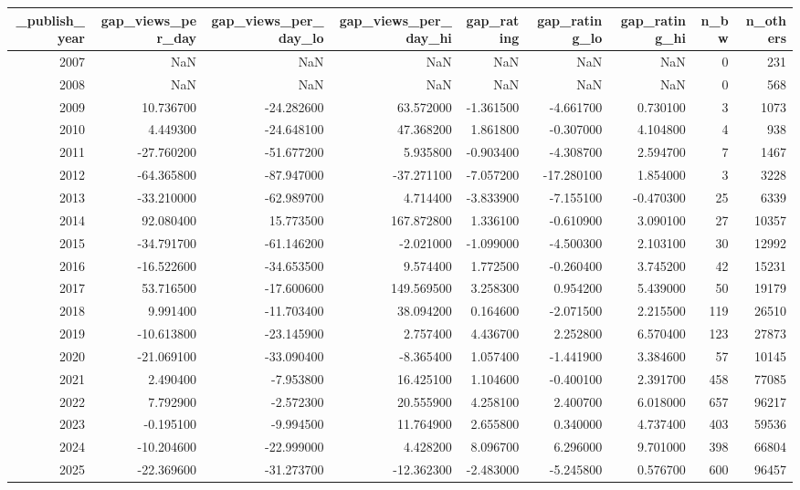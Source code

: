 \begin{tabular}{rrrrrrrrr}
\toprule
_publish_year & gap_views_per_day & gap_views_per_day_lo & gap_views_per_day_hi & gap_rating & gap_rating_lo & gap_rating_hi & n_bw & n_others \\
\midrule
2007 & NaN & NaN & NaN & NaN & NaN & NaN & 0 & 231 \\
2008 & NaN & NaN & NaN & NaN & NaN & NaN & 0 & 568 \\
2009 & 10.736700 & -24.282600 & 63.572000 & -1.361500 & -4.661700 & 0.730100 & 3 & 1073 \\
2010 & 4.449300 & -24.648100 & 47.368200 & 1.861800 & -0.307000 & 4.104800 & 4 & 938 \\
2011 & -27.760200 & -51.677200 & 5.935800 & -0.903400 & -4.308700 & 2.594700 & 7 & 1467 \\
2012 & -64.365800 & -87.947000 & -37.271100 & -7.057200 & -17.280100 & 1.854000 & 3 & 3228 \\
2013 & -33.210000 & -62.989700 & 4.714400 & -3.833900 & -7.155100 & -0.470300 & 25 & 6339 \\
2014 & 92.080400 & 15.773500 & 167.872800 & 1.336100 & -0.610900 & 3.090100 & 27 & 10357 \\
2015 & -34.791700 & -61.146200 & -2.021000 & -1.099000 & -4.500300 & 2.103100 & 30 & 12992 \\
2016 & -16.522600 & -34.653500 & 9.574400 & 1.772500 & -0.260400 & 3.745200 & 42 & 15231 \\
2017 & 53.716500 & -17.600600 & 149.569500 & 3.258300 & 0.954200 & 5.439000 & 50 & 19179 \\
2018 & 9.991400 & -11.703400 & 38.094200 & 0.164600 & -2.071500 & 2.215500 & 119 & 26510 \\
2019 & -10.613800 & -23.145900 & 2.757400 & 4.436700 & 2.252800 & 6.570400 & 123 & 27873 \\
2020 & -21.069100 & -33.090400 & -8.365400 & 1.057400 & -1.441900 & 3.384600 & 57 & 10145 \\
2021 & 2.490400 & -7.953800 & 16.425100 & 1.104600 & -0.400100 & 2.391700 & 458 & 77085 \\
2022 & 7.792900 & -2.572300 & 20.555900 & 4.258100 & 2.400700 & 6.018000 & 657 & 96217 \\
2023 & -0.195100 & -9.994500 & 11.764900 & 2.655800 & 0.340000 & 4.737400 & 403 & 59536 \\
2024 & -10.204600 & -22.999000 & 4.428200 & 8.096700 & 6.296000 & 9.701000 & 398 & 66804 \\
2025 & -22.369600 & -31.273700 & -12.362300 & -2.483000 & -5.245800 & 0.576700 & 600 & 96457 \\
\bottomrule
\end{tabular}
